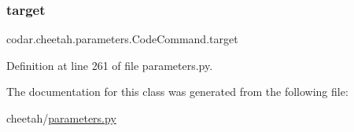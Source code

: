 \subsubsection{\texorpdfstring{target}{target}}
{\footnotesize\ttfamily codar.\+cheetah.\+parameters.\+Code\+Command.\+target}



Definition at line 261 of file parameters.\+py.



The documentation for this class was generated from the following file\+:\begin{DoxyCompactItemize}
\item 
cheetah/\hyperlink{parameters_8py}{parameters.\+py}\end{DoxyCompactItemize}
